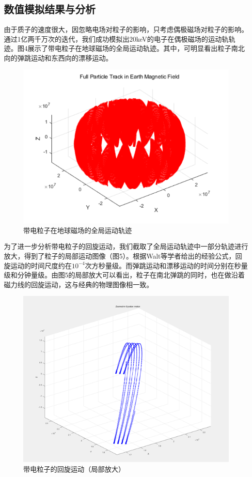 \documentclass[11pt]{article}
\begin{document}
\clearpage

\subsection{数值模拟结果与分析}
由于质子的速度很大，因忽略电场对粒子的影响，只考虑偶极磁场对粒子的影响。通过1亿两千万次的迭代，我们成功模拟出20keV的电子在偶极磁场的运动轨轨迹。图4展示了带电粒子在地球磁场的全局运动轨迹。其中，可明显看出粒子南北向的弹跳运动和东西向的漂移运动。

\begin{figure}[h]
    \centering
    \includegraphics[width=0.75\linewidth]{Fig/fulltrack.png}
    \caption{带电粒子在地球磁场的全局运动轨迹}
    \label{fig:4}
\end{figure}


为了进一步分析带电粒子的回旋运动，我们截取了全局运动轨迹中一部分轨迹进行放大，得到了粒子的局部运动图像（图5）。根据Walt等学者给出的经验公式，回旋运动的时间尺度约在${10}^{-4}$次方秒量级。而弹跳运动和漂移运动的时间分别在秒量级和分钟量级。由图5的局部放大可以看出，粒子在南北弹跳的同时，也在做沿着磁力线的回旋运动，这与经典的物理图像相一致。

\begin{figure}[h]
    \centering
    \includegraphics[width=0.5\linewidth]{Fig/zoompart.png}
    \caption{带电粒子的回旋运动（局部放大）}
    \label{fig:5}
\end{figure}
\end{document}
